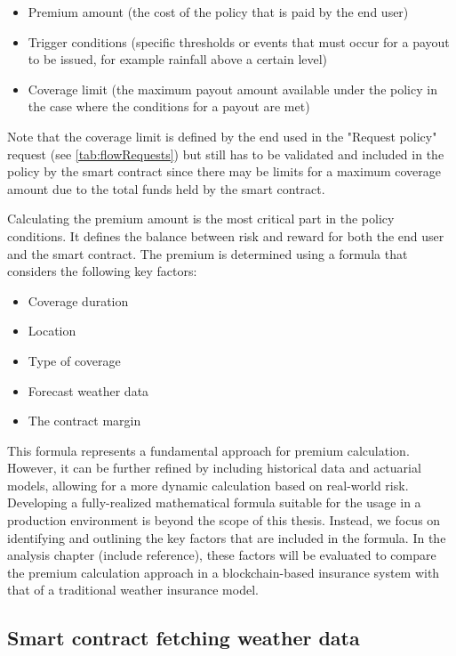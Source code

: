 \begin{itemize}
    \item Premium amount (the cost of the policy that is paid by the end user)
    \item Trigger conditions (specific thresholds or events that must occur for a payout to be issued, for example rainfall above a certain level)
    \item Coverage limit (the maximum payout amount available under the policy in the case where the conditions for a payout are met)
\end{itemize}

Note that the coverage limit is defined by the end used in the "Request policy" request (see \cref{tab:flowRequests}) but still has to be validated and included in the policy by the smart contract since there may be limits for a maximum coverage amount due to the total funds held by the smart contract.

Calculating the premium amount is the most critical part in the policy conditions. It defines the balance between risk and reward for both the end user and the smart contract. The premium is determined using a formula that considers the following key factors:

\begin{itemize}
    \item Coverage duration
    \item Location
    \item Type of coverage
    \item Forecast weather data
    \item The contract margin
\end{itemize}

This formula represents a fundamental approach for premium calculation. However, it can be further refined by including historical data and actuarial models, allowing for a more dynamic calculation based on real-world risk. Developing a fully-realized mathematical formula suitable for the usage in a production environment is beyond the scope of this thesis. Instead, we focus on identifying and outlining the key factors that are included in the formula. In the analysis chapter (include reference), these factors will be evaluated to compare the premium calculation approach in a blockchain-based insurance system with that of a traditional weather insurance model.

\subsection{Smart contract fetching weather data}

